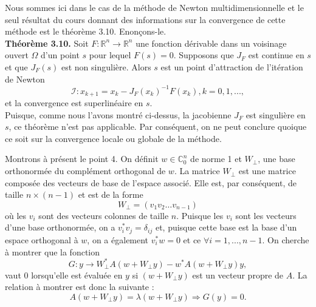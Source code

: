 Nous sommes ici dans le cas de la méthode de Newton multidimensionnelle et le seul résultat du cours donnant des informations sur la convergence de cette méthode est le théorème 3.10. Enonçons-le.\\
\textbf{Théorème 3.10.} Soit $F : \mathbb{R}^n \rightarrow \mathbb{R}^n$ une fonction dérivable dans un voisinage ouvert $\Omega$ d'un point $s$ pour lequel $F(s)=0$. Supposons que $J_F$ est continue en $s$ et que $J_F(s)$ est non singulière. Alors $s$ est un point d'attraction de l'itération de Newton $$\mathcal{I} : x_{k+1} = x_k - J_F(x_k)^{-1}F(x_k), k = 0,1,...,$$ et la convergence est superlinéaire en $s$.\\
Puisque, comme nous l'avons montré ci-dessus, la jacobienne $J_F$ est singulière en $s$, ce théorème n'est pas applicable. Par conséquent, on ne peut conclure quoique ce soit sur la convergence locale ou globale de la méthode.



Montrons à présent le point 4. On définit $w \in \mathbb{C}_0^n$ de norme 1 et $W_{\bot}$, une base orthonormée du complément orthogonal de $w$. La matrice $W_{\bot}$ est une matrice composée des vecteurs de base de l'espace associé. Elle est, par conséquent, de taille $n \times (n-1)$ et est de la forme $$W_{\bot} = (v_1 v_2 \hdots v_{n-1})$$ où les $v_i$ sont des vecteurs colonnes de taille $n$. Puisque les $v_i$ sont les vecteurs d'une base orthonormée, on a $v_i^*v_j = \delta_{ij}$ et, puisque cette base est la base d'un espace orthogonal à $w$, on a également $v_i^*w = 0$ et ce $\forall i = 1,...,n-1$.%
On cherche à montrer que la fonction
\begin{equation} \label{eq_point4_q1}
 G:y \rightarrow W_{\bot}^* A(w+ W_{\bot}y) - w^*A(w+ W_{\bot}y)y,
\end{equation}
vaut $0$ lorsqu'elle est évaluée en $y$ si $(w+ W_{\bot}y)$ est un vecteur propre de $A$. La relation à montrer est donc la suivante : $$A(w+ W_{\bot}y) = \lambda (w+ W_{\bot}y) \Rightarrow G(y)=0.$$

